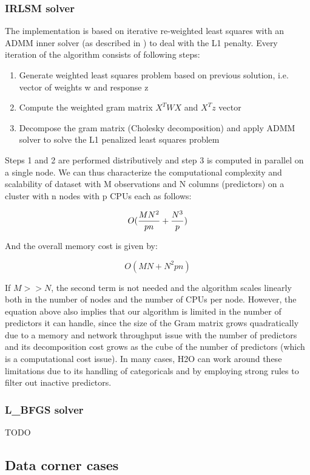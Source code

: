\subsubsection{IRLSM solver}

The implementation is based on iterative re-weighted least squares with an ADMM inner solver (as described
in ) to deal with the L1 penalty. Every iteration of the algorithm consists of following steps:

\begin{enumerate} 
\item Generate weighted least squares problem based on previous solution, i.e. vector of weights w and response z 
\item Compute the weighted gram matrix $X^TWX$ and $X^Tz$ vector
\item Decompose the gram matrix (Cholesky decomposition) and apply ADMM solver to solve the L1 penalized least squares problem
\end{enumerate}

Steps 1 and 2 are performed distributively and step 3 is computed in parallel on a single node. We can thus
characterize the computational complexity and scalability of dataset with M observations and N columns (predictors)
on a cluster with n nodes with p CPUs each as follows:

\[ O({MN^2 \over pn} + {N^3 \over p})\]

And the overall memory cost is given by:

\[ O(MN + N^2pn)\]

If $M >> N$, the second term is not needed and the algorithm scales linearly both in the number of nodes and the
number of CPUs per node. However, the equation above also implies that our algorithm is limited in the number of
predictors it can handle, since the size of the Gram matrix grows quadratically due to a memory and network
throughput issue with the number of predictors and its decomposition cost grows as the cube of the number of
predictors (which is a computational cost issue). In many cases, H2O can work around these limitations due to its
handling of categoricals and by employing strong rules to filter out inactive predictors.

\subsubsection{L\_BFGS solver}

TODO

\subsection{Data corner cases}

